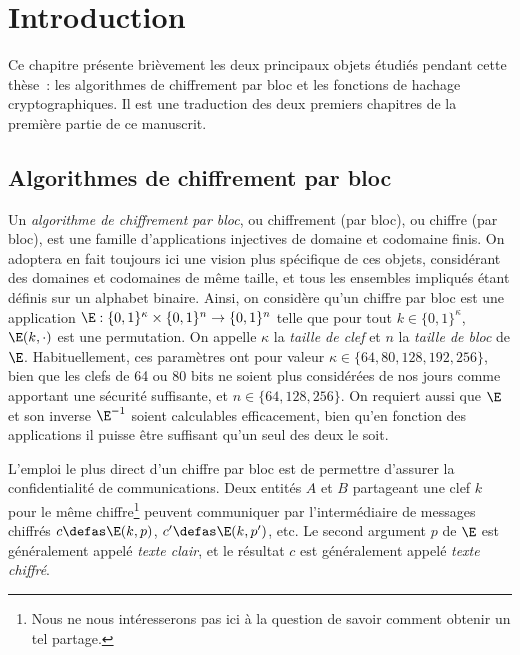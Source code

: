 



\chapter[Introduction]{Introduction}

Ce chapitre présente brièvement les deux principaux objets étudiés pendant cette thèse~: les algorithmes
de chiffrement par bloc et les fonctions de hachage cryptographiques. Il est une traduction
des deux premiers chapitres de la première partie de ce manuscrit.

\medskip

\begin{center}
\aldineleft
\end{center}

\medskip


\section{Algorithmes de chiffrement par bloc}

Un \emph{algorithme de chiffrement par bloc}, ou chiffrement (par bloc), ou chiffre (par bloc), est une famille d'applications
injectives de domaine et codomaine finis. On adoptera en fait toujours ici une vision plus spécifique de ces objets,
considérant des domaines et codomaines de même taille, et tous les ensembles impliqués étant définis sur un alphabet
binaire. Ainsi, on considère qu'un chiffre par bloc est une application
$\E : \{0,1\}^\kappa \times \{0,1\}^n \rightarrow \{0,1\}^n$
telle que pour tout $k \in \{0,1\}^\kappa$, $\E(k,\cdot)$ est une permutation.
On appelle
$\kappa$ la \emph{taille de clef} et $n$ la \emph{taille de bloc} de $\E$. Habituellement, ces paramètres ont pour valeur
$\kappa \in \{64, 80, 128, 192, 256\}$, bien que les clefs de 64 ou 80 bits ne soient plus considérées de nos jours
comme apportant une sécurité suffisante, et 
$n \in \{64, 128, 256\}$.
On requiert aussi que $\E$ et son inverse $\E^{-1}$ soient calculables efficacement, bien qu'en fonction des applications
il puisse être suffisant qu'un seul des deux le soit. 

L'emploi le plus direct d'un chiffre par bloc est de permettre d'assurer la confidentialité de communications.
Deux entités $A$ et $B$ partageant une clef $k$ pour le même chiffre\footnote{Nous ne nous intéresserons pas ici à la question de savoir
comment obtenir un tel partage.} peuvent communiquer par l'intermédiaire de messages chiffrés $c \defas \E(k,p)$,
$c' \defas \E(k,p')$, etc. Le second argument $p$ de $\E$ est généralement appelé 
\emph{texte clair}, et le résultat $c$ est généralement appelé \emph{texte chiffré}.


